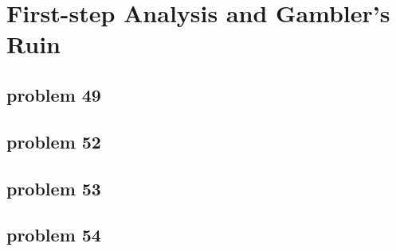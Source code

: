 \section{First-step Analysis and Gambler's Ruin}

\subsection{problem 49}


\subsection{problem 52}


\subsection{problem 53}


\subsection{problem 54}
